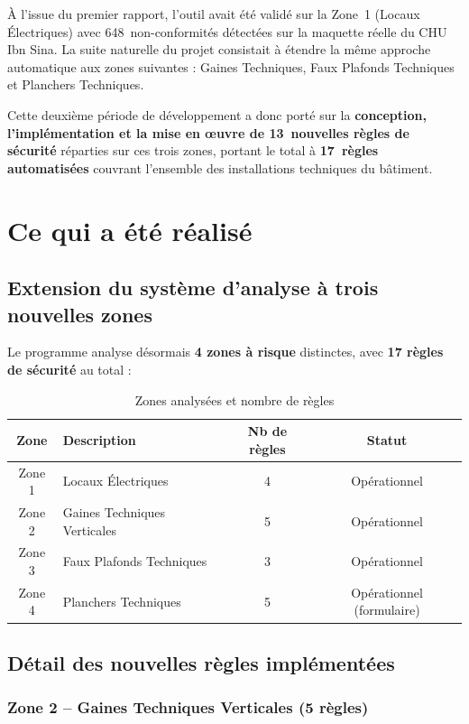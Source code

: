 \documentclass[a4paper,12pt]{article}
\begin{document}
À l'issue du premier rapport, l'outil avait été validé sur la Zone~1 (Locaux Électriques) avec 648~non-conformités détectées sur la maquette réelle du CHU Ibn Sina. La suite naturelle du projet consistait à étendre la même approche automatique aux zones suivantes : Gaines Techniques, Faux Plafonds Techniques et Planchers Techniques.

Cette deuxième période de développement a donc porté sur la \textbf{conception, l'implémentation et la mise en œuvre de 13~nouvelles règles de sécurité} réparties sur ces trois zones, portant le total à \textbf{17~règles automatisées} couvrant l'ensemble des installations techniques du bâtiment.

\section{Ce qui a été réalisé}

\subsection{Extension du système d'analyse à trois nouvelles zones}

Le programme analyse désormais \textbf{4 zones à risque} distinctes, avec \textbf{17 règles de sécurité} au total :

\begin{table}[h!]
\centering
\begin{tabular}{clcc}
\toprule
\textbf{Zone} & \textbf{Description} & \textbf{Nb de règles} & \textbf{Statut} \\
\midrule
Zone 1 & Locaux Électriques           & 4 & Opérationnel \\
Zone 2 & Gaines Techniques Verticales & 5 & Opérationnel \\
Zone 3 & Faux Plafonds Techniques     & 3 & Opérationnel \\
Zone 4 & Planchers Techniques         & 5 & Opérationnel (formulaire) \\
\bottomrule
\end{tabular}
\caption{Zones analysées et nombre de règles}
\end{table}

\subsection{Détail des nouvelles règles implémentées}

\subsubsection*{Zone 2 -- Gaines Techniques Verticales (5 règles)}
\end{document}
